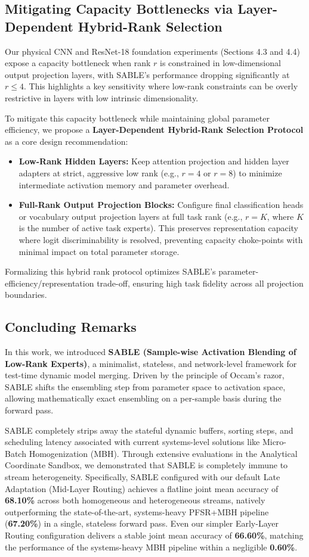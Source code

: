 \subsection{Mitigating Capacity Bottlenecks via Layer-Dependent Hybrid-Rank Selection}
Our physical CNN and ResNet-18 foundation experiments (Sections 4.3 and 4.4) expose a capacity bottleneck when rank $r$ is constrained in low-dimensional output projection layers, with SABLE's performance dropping significantly at $r \le 4$. This highlights a key sensitivity where low-rank constraints can be overly restrictive in layers with low intrinsic dimensionality.

To mitigate this capacity bottleneck while maintaining global parameter efficiency, we propose a \textbf{Layer-Dependent Hybrid-Rank Selection Protocol} as a core design recommendation:
\begin{itemize}
    \item \textbf{Low-Rank Hidden Layers:} Keep attention projection and hidden layer adapters at strict, aggressive low rank (e.g., $r=4$ or $r=8$) to minimize intermediate activation memory and parameter overhead.
    \item \textbf{Full-Rank Output Projection Blocks:} Configure final classification heads or vocabulary output projection layers at full task rank (e.g., $r = K$, where $K$ is the number of active task experts). This preserves representation capacity where logit discriminability is resolved, preventing capacity choke-points with minimal impact on total parameter storage.
\end{itemize}
Formalizing this hybrid rank protocol optimizes SABLE's parameter-efficiency/representation trade-off, ensuring high task fidelity across all projection boundaries.

\subsection{Concluding Remarks}
In this work, we introduced \textbf{SABLE (Sample-wise Activation Blending of Low-Rank Experts)}, a minimalist, stateless, and network-level framework for test-time dynamic model merging. Driven by the principle of Occam's razor, SABLE shifts the ensembling step from parameter space to activation space, allowing mathematically exact ensembling on a per-sample basis during the forward pass. 

SABLE completely strips away the stateful dynamic buffers, sorting steps, and scheduling latency associated with current systems-level solutions like Micro-Batch Homogenization (MBH). Through extensive evaluations in the Analytical Coordinate Sandbox, we demonstrated that SABLE is completely immune to stream heterogeneity. Specifically, SABLE configured with our default Late Adaptation (Mid-Layer Routing) achieves a flatline joint mean accuracy of \textbf{68.10\%} across both homogeneous and heterogeneous streams, natively outperforming the state-of-the-art, systems-heavy PFSR+MBH pipeline (\textbf{67.20\%}) in a single, stateless forward pass. Even our simpler Early-Layer Routing configuration delivers a stable joint mean accuracy of \textbf{66.60\%}, matching the performance of the systems-heavy MBH pipeline within a negligible \textbf{0.60\%}.


